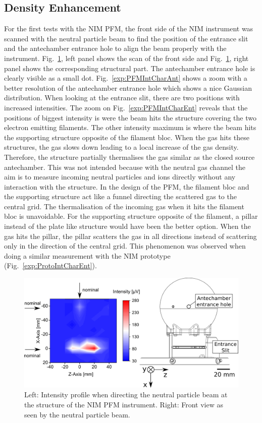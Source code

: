 	\subsection{Density Enhancement}\label{chap:expDensEntSlit}
	For the first tests with the NIM PFM, the front side of the NIM instrument was scanned with the neutral particle beam to find the position of the entrance slit and the antechamber entrance hole to align the beam properly with the instrument. Fig.~\ref{exp:PFMIntCharTot}, left panel shows the scan of the front side and Fig.~\ref{exp:PFMIntCharTot}, right panel shows the corresponding structural part. The antechamber entrance hole is clearly visible as a small dot. Fig.~\ref{exp:PFMIntCharAnt} shows a zoom with a better resolution of the antechamber entrance hole which shows a nice Gaussian distribution. When looking at the entrance slit, there are two positions with increased intensities. The zoom on Fig.~\ref{exp:PFMIntCharEnt} reveals that the positions of biggest intensity is were the beam hits the structure covering the two electron emitting filaments. The other intensity maximum is where the beam hits the supporting structure opposite of the filament bloc. When the gas hits these structures, the gas slows down leading to a local increase of the gas density. Therefore, the structure partially thermalises the gas similar as the closed source antechamber. This was not intended because with the neutral gas channel the aim is to measure incoming neutral particles and ions directly without any interaction with the structure. In the design of the PFM, the filament bloc and the supporting structure act like a funnel directing the scattered gas to the central grid. The thermalisation of the incoming gas when it hits the filament bloc is unavoidable. For the supporting structure opposite of the filament, a pillar instead of the plate like structure would have been the better option. When the gas hits the pillar, the pillar scatters the gas in all directions instead of scattering only in the direction of the central grid. This phenomenon was observed when doing a similar measurement with the NIM prototype (Fig.~\ref{exp:ProtoIntCharEnt}).\\
	\begin{figure}[H]
		\centering
		\includegraphics[width=\textwidth]{Experiments/2D_scan_anteEntr.png}
		\caption{Left: Intensity profile when directing the neutral particle beam at the structure of the NIM PFM instrument. Right: Front view as seen by the neutral particle beam.}
		\label{exp:PFMIntCharTot}
	\end{figure}
